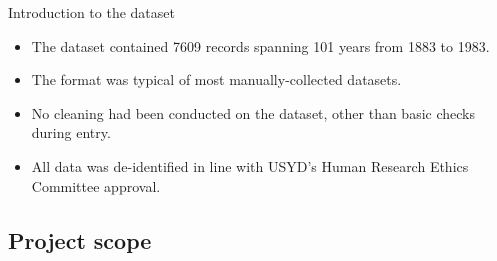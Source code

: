 \documentclass[]{beamer}
\begin{document}
\begin{frame}[fragile]{Introduction to the dataset}

	\begin{itemize}
		\item The dataset contained 7609 records spanning 101 years from 1883 to 1983.
		\item The format was typical of most manually-collected datasets.
		\item No cleaning had been conducted on the dataset, other than basic checks during entry.
		\item All data was de-identified in line with USYD's Human Research Ethics Committee approval.\footnotemark
	\end{itemize}


\end{frame}







	\subsection{Project scope}
\end{document}
